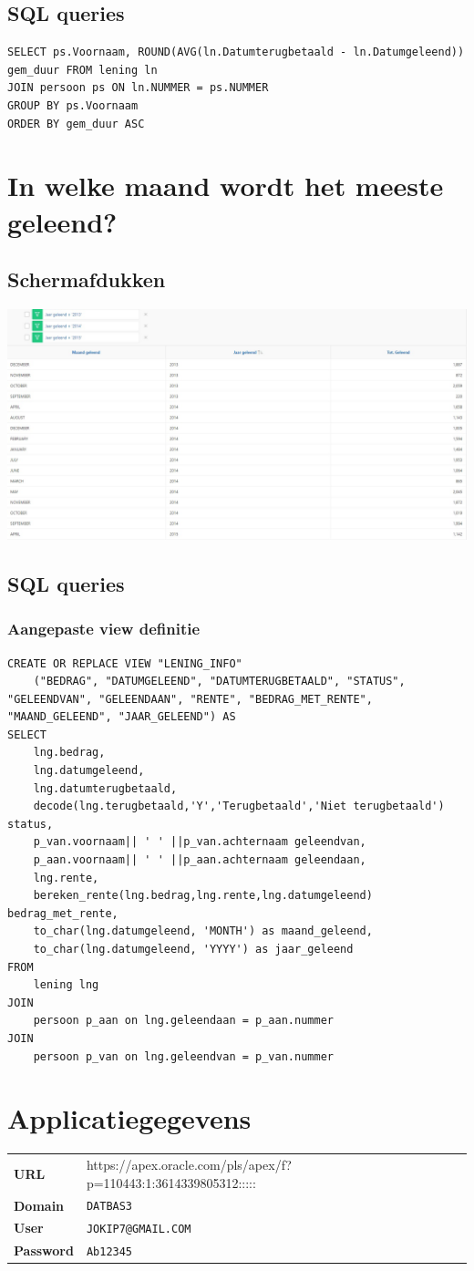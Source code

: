 \documentclass[11pt,english]{article}
\begin{document}
	\subsection{SQL queries}
	\begin{lstlisting}
SELECT ps.Voornaam, ROUND(AVG(ln.Datumterugbetaald - ln.Datumgeleend)) gem_duur FROM lening ln
JOIN persoon ps ON ln.NUMMER = ps.NUMMER 
GROUP BY ps.Voornaam
ORDER BY gem_duur ASC
	\end{lstlisting}

	\newpage
	\section{In welke maand wordt het meeste geleend?}
	\subsection{Schermafdukken}
	\includegraphics[scale=0.5]{week6-overzicht}

	\subsection{SQL queries}
	\subsubsection{Aangepaste view definitie}
	\begin{lstlisting}
CREATE OR REPLACE VIEW "LENING_INFO"
	("BEDRAG", "DATUMGELEEND", "DATUMTERUGBETAALD", "STATUS", "GELEENDVAN", "GELEENDAAN", "RENTE", "BEDRAG_MET_RENTE", "MAAND_GELEEND", "JAAR_GELEEND") AS
SELECT
	lng.bedrag,
	lng.datumgeleend,
	lng.datumterugbetaald,
	decode(lng.terugbetaald,'Y','Terugbetaald','Niet terugbetaald') status,
	p_van.voornaam|| ' ' ||p_van.achternaam geleendvan,
	p_aan.voornaam|| ' ' ||p_aan.achternaam geleendaan,
	lng.rente,
	bereken_rente(lng.bedrag,lng.rente,lng.datumgeleend) bedrag_met_rente,
	to_char(lng.datumgeleend, 'MONTH') as maand_geleend,
	to_char(lng.datumgeleend, 'YYYY') as jaar_geleend
FROM
	lening lng
JOIN
	persoon p_aan on lng.geleendaan = p_aan.nummer
JOIN
	persoon p_van on lng.geleendvan = p_van.nummer
	\end{lstlisting}

	\newpage
	\section{Applicatiegegevens}
	\begin{tabular}{ l l }
		\textbf{URL} & https://apex.oracle.com/pls/apex/f?p=110443:1:3614339805312::::: \\
		\textbf{Domain} & \texttt{DATBAS3} \\
		\textbf{User} & \texttt{JOKIP7@GMAIL.COM} \\
		\textbf{Password} & \texttt{Ab12345} \\
	\end{tabular}
\end{document}

